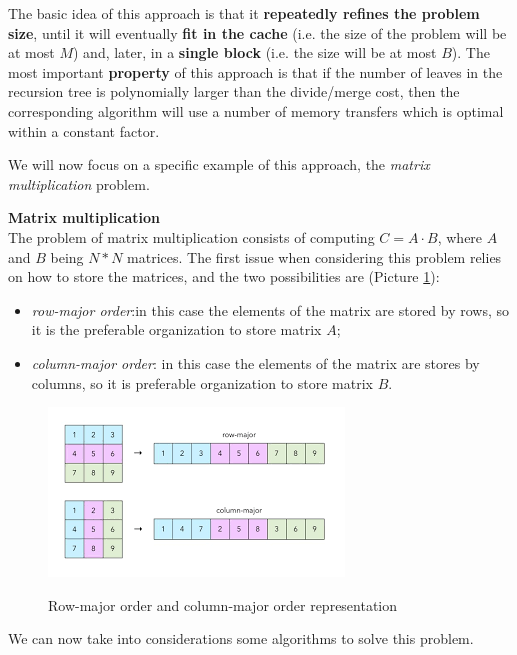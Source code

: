 The basic idea of this approach is that it \textbf{repeatedly refines the problem size}, until it will eventually \textbf{fit in the cache} (i.e. the size of the problem will be at most $M$) and, later, in a \textbf{single block} (i.e. the size will be at most $B$). The most important \textbf{property} of this approach is that if the number of leaves in the recursion tree is polynomially larger than the divide/merge cost, then the corresponding algorithm will use a number of memory transfers which is optimal within a constant factor.

We will now focus on a specific example of this approach, the \textit{matrix multiplication} problem.

\textbf{Matrix multiplication} \\
The problem of matrix multiplication consists of computing $C = A \cdot B$, where $A$ and $B$ being $N*N$ matrices. The first issue when considering this problem relies on how to store the matrices, and the two possibilities are (Picture \ref{row_column_major}):

\begin{itemize}

    \item \textit{row-major order}:in this case the elements of the matrix are stored by rows, so it is the preferable organization to store matrix $A$;

    \item \textit{column-major order}: in this case the elements of the matrix are stores by columns, so it is preferable organization to store matrix $B$.
    
\end{itemize}

\begin{figure}[h!]
		\centering
		\includegraphics[scale = 0.9]{img/row_column_major.png}
        \label{row_column_major}
        \caption{Row-major order and column-major order representation}
\end{figure}

We can now take into considerations some algorithms to solve this problem.


